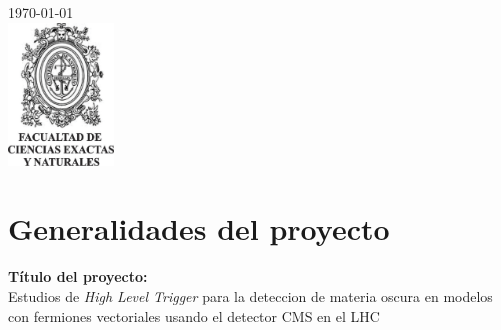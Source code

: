 \begin{titlepage}


{\large \today}\\[0.7cm] %


\includegraphics[width=2.8cm]{udea_fcen.jpg}\\[4cm] %
 

\vfill %

\end{titlepage}

\tableofcontents %

\cleardoublepage





\section{Generalidades del proyecto}

\textbf{Título del proyecto:}\\
Estudios de \textit{High Level Trigger} para la deteccion de materia oscura en modelos con fermiones vectoriales usando el detector CMS en el LHC
\\

